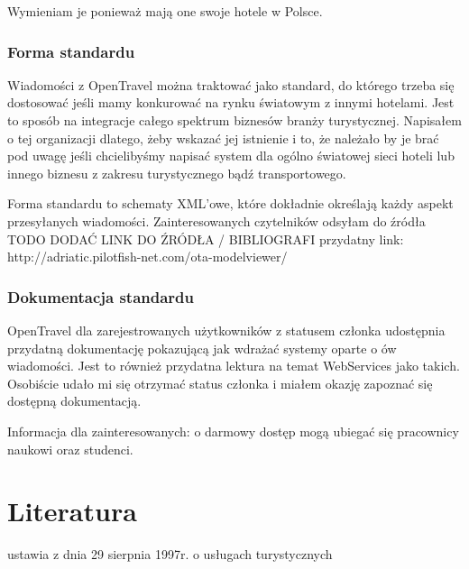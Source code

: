 \documentclass[a4paper,onecolumn,oneside,11pt,wide,floatssmall]{mwrep}
\theoremstyle{definition}
\theoremstyle{plain}%
\theoremstyle{remark}
\begin{document}
Wymieniam je ponieważ mają one swoje hotele w Polsce. 

\subsubsection{Forma standardu}
Wiadomości z OpenTravel można traktować jako standard, do którego trzeba się
dostosować jeśli mamy konkurować na rynku światowym z innymi hotelami. Jest to
sposób na integracje całego spektrum biznesów branży turystycznej. Napisałem o
tej organizacji dlatego, żeby wskazać jej istnienie i to, że należało by je brać
pod uwagę jeśli chcielibyśmy napisać system dla ogólno światowej sieci hoteli
lub innego biznesu z zakresu turystycznego bądź transportowego.

Forma standardu to schematy XML'owe, które dokładnie określają każdy aspekt
przesyłanych wiadomości. Zainteresowanych czytelników odsyłam do źródła TODO
DODAĆ LINK DO ŹRÓDŁA / BIBLIOGRAFI
przydatny link: http://adriatic.pilotfish-net.com/ota-modelviewer/

\subsubsection{Dokumentacja standardu}
OpenTravel dla zarejestrowanych użytkowników z statusem członka udostępnia
przydatną dokumentację pokazującą jak wdrażać systemy oparte o ów wiadomości.
Jest to również przydatna lektura na temat WebServices jako takich. Osobiście
udało mi się otrzymać status członka i miałem okazję zapoznać się dostępną
dokumentacją.

Informacja dla zainteresowanych: o darmowy dostęp mogą ubiegać się pracownicy
naukowi oraz studenci.

\section{Literatura}

ustawia z dnia 29 sierpnia 1997r. o usługach turystycznych




\appendix


\nocite{*}


% 

\end{document}
